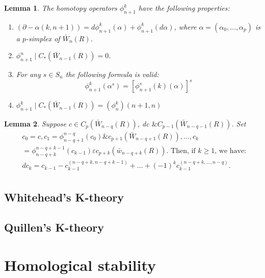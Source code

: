 \documentclass{book}
\newtheorem{lemm}{Lemma}
\begin{document}
\begin{lemm}
The homotopy operators $\phi_{n+1}^k$ have the following properties:
    \begin{enumerate}
        \item $(\partial - \alpha(k, n+1))=d \phi_{n+1}^k(\alpha)+\phi_{n+1}^k(d \alpha)$, where $\alpha=\left(\alpha_0, \ldots, \alpha_p\right)$ is a $p$-simplex of $\bar{W}_n(R)$.
        \item $\phi_{n+1}^n \mid C_*\left(\bar{W}_{n-1}(R)\right)=0$.
        \item For any $s \in S_n$ the following formula is valid:
        $$
        \phi_{n+1}^k\left(\alpha^s\right)=\left[\phi_{n+1}^s(k)(\alpha)\right]^s
        $$
        \item $\phi_{n+1}^k \mid C_*\left(\bar{W}_{n-1}(R)\right)=\left(\phi_n^k\right)(n+1, n)$   
    \end{enumerate}
\end{lemm}

\begin{lemm}
Suppose $c \in C_p\left(\bar{W}_{n-q}(R)\right)$, dc $\& C_{p-1}\left(\bar{W}_{n-q-1}(R)\right)$. Set
    $$
    \begin{aligned}
    & c_0=c, c_1=\phi_{n-q+1}^{n-q}\left(c_0\right) \& c_{p+1}\left(\bar{W}_{n-q+1}(R)\right), \ldots, c_k \\
    & =\phi_{n-q+k}^{n-q+k-1}\left(c_{k-1}\right) \varepsilon c_{p+k}\left(\bar{w}_{n-q+k}(R)\right) \text {. Then, if } k \geq 1 \text {, we have: } \\
    & d c_k=c_{k-1}-c_{k-1}^{(n-q+k, n-q+k-1)}+\ldots+(-1)^k c_{k-1}^{(n-q+k, \ldots, n-q)} . \\
    &
    \end{aligned}$$
\end{lemm}








\section{Whitehead's K-theory}

\section{Quillen's K-theory}



\chapter{Homological stability}
\end{document}
